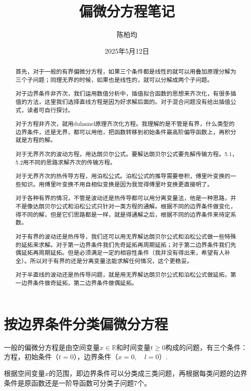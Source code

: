 \documentclass[12pt,a4paper]{article}
\title{偏微分方程笔记}
\author{陈柏均}
\date{2025年5月12日}
\newcommand{\R}{\mathbb{R}}
\numberwithin{subsection}{section}   %
\numberwithin{subsubsection}{subsection}
\theoremstyle{plain}
\theoremstyle{definition}
\theoremstyle{remark}
\theoremstyle{remark}
\begin{document}
	
	\maketitle

 \begin{abstract}
	 首先，对于一般的有界偏微分方程，如果三个条件都是线性的就可以用叠加原理分解为三个子问题；同理无界的时候，如果也是线性的，就可以分解成两个子问题。
	 
	 对于边界条件非齐次，我们运用数值分析中，插值拟合函数的思想来齐次化，有很多插值的方法，这里我们选择直线方程是因为好求解后面的。对于混合问题没有给出插值公式，读者可自行探讨。
	 
	 对于方程非齐次，就用duhamel原理齐次化方程。我理解的是不管是有界，什么类型的边界条件，还是无界，都可以用他，把函数转移到初始条件最高阶偏导函数上，再积分就是方程的解。
	 
	 对于无界齐次的波动方程，用达朗贝尔公式。要解达朗贝尔公式要先解传输方程。5.1，5.2用不同的思路求解齐次的传输方程。
	 
	 对于无界齐次的热传导方程，用泊松公式。泊松公式的推导需要卷积，傅里叶变换的一些知识。用傅里叶变换不用自相似变换是因为我觉得傅里叶变换更直接明了。
	 
	 对于各种有界的情况，不管是波动还是热传导都可以用分离变量法，他是一种思路，并不是像达朗贝尔公式和泊松公式只针对一类方程的通解。根据不同的边界条件做变化，得不同的解，但是它们思路都是一样，就是得通解之后，根据不同的边界条件来待定系数。
	 
	 对于有界的波动还是热传导，我们还可以用无界解达朗贝尔公式和泊松公式做一些特殊的延拓来求解。对于第一边界条件我们先奇延拓再周期延拓；对于第二边界条件我们先偶延拓再周期延拓。但是必须满足一定的相容性条件（我并没有得出来，希望有人补全）。所以对于有界的还是分离变量法能求解任何情况，这个更稳妥。
	 
	 对于半直线的波动还是热传导问题，就是用无界解达朗贝尔公式和泊松公式做延拓，第一边界条件做奇延拓，第二边界条件做偶延拓。
\end{abstract}


\newpage
	
	\tableofcontents  %
	
	
	\newpage
	\section{按边界条件分类偏微分方程}
	一般的偏微分方程是由空间变量$x \in \R$和时间变量$t \geq 0$构成的问题，有三个条件：方程，初始条件（$t=0$），边界条件（$x=0, \quad l=0$）.
	  
	  根据空间变量$x$的范围，即边界条件可以分类成三类问题，再根据每类问题的边界条件是原函数还是一阶导函数可分类子问题7个。
	  
\end{document}
